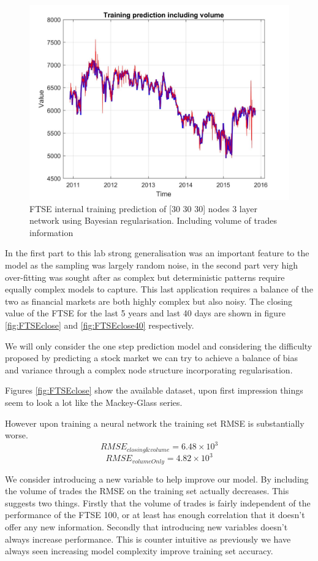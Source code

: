 \documentclass[a4paper,10pt, twocolumn]{article}
\begin{document}
\begin{figure}[ht]
	\includegraphics[width=0.9\linewidth]{FTSEtrainVol.jpg}
	\centering
	\caption{ FTSE internal training prediction of [30 30 30] nodes 3 layer network using Bayesian regularisation. Including volume of trades information }
		\label{fig:FTSEtrainVol}
\end{figure}
In the first part to this lab strong generalisation was an important feature to the model as the sampling was largely random noise, in the second part very high over-fitting was sought after as complex but deterministic patterns require equally complex models to capture. This last application requires a balance of the two as financial markets are both highly complex but also noisy. The closing value of the FTSE for the last 5 years and last 40 days are shown in figure \ref{fig:FTSEclose} and \ref{fig:FTSEclose40} respectively. 

We will only consider the one step prediction model and considering the difficulty proposed by predicting a stock market we can try to achieve a balance of bias and variance through a complex node structure incorporating regularisation. 

Figures \ref{fig:FTSEclose} show the available dataset, upon first impression things seem to look a lot like the Mackey-Glass series. 

However upon training a neural network the training set RMSE is substantially worse. $$RMSE_{closing\&volume} = 6.48 \times 10^3$$
$$RMSE_{volume Only} = 4.82 \times 10^3$$

We consider introducing a new variable to help improve our model. By including the volume of trades the RMSE on the training set actually decreases. This suggests two things. Firstly that the volume of trades is fairly independent of the performance of the FTSE 100, or at least has enough correlation that it doesn't offer any new information. Secondly that introducing new variables doesn't always increase performance. This is counter intuitive as previously we have always seen increasing model complexity improve training set accuracy. 
\end{document}
